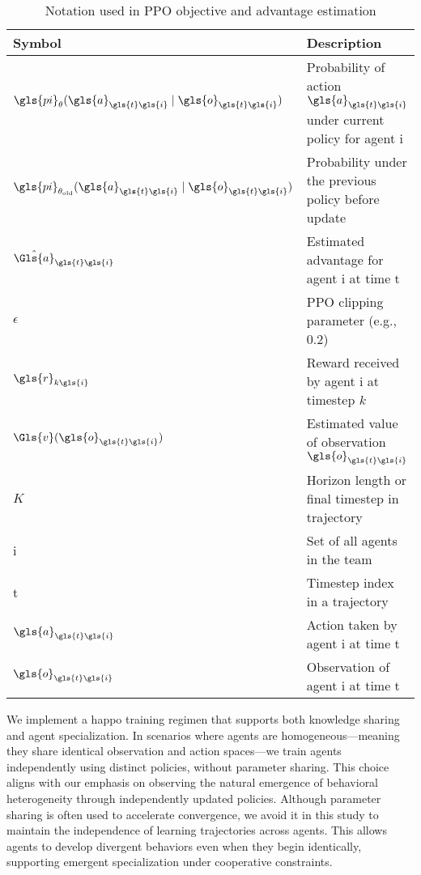 \begin{table}[ht]
    \centering
    \caption{Notation used in PPO objective and advantage estimation}
    \begin{tabular}{ll}
    \toprule
    \textbf{Symbol} & \textbf{Description} \\
    \midrule
    \(\gls{pi}_\theta(\gls{a}_{\gls{t}\gls{i}} \mid \gls{o}_{\gls{t}\gls{i}})\) & 
        Probability of action \(\gls{a}_{\gls{t}\gls{i}}\) under current policy 
        for agent \gls{i} \\
    \(\gls{pi}_{\theta_{\text{old}}}(\gls{a}_{\gls{t}\gls{i}} \mid \gls{o}_{\gls{t}\gls{i}})\) & 
        Probability under the previous policy before update \\
    \(\hat{\Gls{a}}_{\gls{t}\gls{i}}\) & Estimated advantage for agent \gls{i} at time \gls{t} \\
    \(\epsilon\) & PPO clipping parameter (e.g., 0.2) \\
    \(\gls{r}_{k\gls{i}}\) & Reward received by agent \gls{i} at timestep \(k\) \\
    \(\Gls{v}(\gls{o}_{\gls{t}\gls{i}})\) & Estimated value of observation \(\gls{o}_{\gls{t}\gls{i}}\) \\
    \(K\) & Horizon length or final timestep in trajectory \\
    \Gls{i} & Set of all agents in the team \\
    \gls{t} & Timestep index in a trajectory \\
    \(\gls{a}_{\gls{t}\gls{i}}\) & Action taken by agent \gls{i} at time \gls{t} \\
    \(\gls{o}_{\gls{t}\gls{i}}\) & Observation of agent \gls{i} at time \gls{t} \\
    \bottomrule
    \end{tabular}
\end{table}

We implement a \gls{happo} training regimen that supports both 
knowledge sharing and agent specialization. In scenarios where agents are 
homogeneous—meaning they share identical observation and action spaces—we train agents 
independently using distinct policies, without parameter sharing. 
This choice aligns with our emphasis on observing the natural emergence of 
behavioral heterogeneity through independently updated policies. 
Although parameter sharing is often used to accelerate convergence, 
we avoid it in this study to maintain the independence of learning trajectories across agents. 
This allows agents to develop divergent behaviors even when they begin identically, 
supporting emergent specialization under cooperative constraints.

